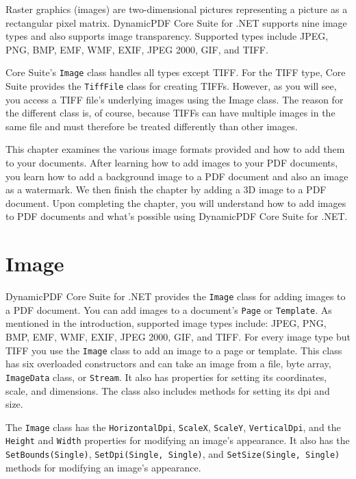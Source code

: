 \documentclass[american]{tufte-book}
\numberwithin{equation}{section}
\numberwithin{figure}{section}
\begin{document}
{{Raster graphics (images) are two-dimensional pictures representing
a picture as a rectangular pixel matrix. DynamicPDF Core Suite
for .NET supports nine image types and also supports image transparency.
Supported types include JPEG, PNG, BMP, EMF, WMF, EXIF, JPEG 2000,
GIF, and TIFF. 

Core Suite's \texttt{Image} class handles all types except TIFF. For
the TIFF type, Core Suite provides the \texttt{TiffFile} class for
creating TIFFs. However, as you will see, you access a TIFF file's
underlying images using the Image class. The reason for the different class is, of course, because TIFFs can have multiple images in the same file and must therefore be treated differently than other images.

This chapter examines the various image formats provided and how to
add them to your documents. After learning how to add images to your
PDF documents, you learn how to add a background image to a PDF document
and also an image as a watermark. We then finish the chapter by adding
a 3D image to a PDF document. Upon completing the chapter, you will
understand how to add images to PDF documents and what's possible
using DynamicPDF Core Suite for .NET.

\section{Image}

DynamicPDF Core Suite for .NET provides the \texttt{Image} class
for adding images to a PDF document. You can add images to a document's
\texttt{Page} or \texttt{Template}. As mentioned in the introduction,
supported image types include: JPEG, PNG, BMP, EMF, WMF, EXIF, JPEG
2000, GIF, and TIFF. For every image type but TIFF you use the \texttt{Image}
class to add an image to a page or template. This class has six overloaded
constructors and can take an image from a file, byte array, \texttt{ImageData}
class, or \texttt{Stream}. It also has properties for setting its
coordinates, scale, and dimensions. The class also includes methods
for setting its dpi and size.

The \texttt{Image} class has the \texttt{HorizontalDpi}, \texttt{ScaleX},
\texttt{ScaleY}, \texttt{VerticalDpi}, and the \texttt{Height} and
\texttt{Width} properties for modifying an image's appearance. It
also has the \texttt{SetBounds(Single)}, \texttt{SetDpi(Single, Single)},
and \texttt{SetSize(Single, Single)} methods for modifying an image's
appearance. 

}}
\end{document}
